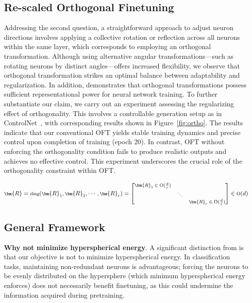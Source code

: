 \begin{itemize}[leftmargin=*,nosep]

\subsection{Re-scaled Orthogonal Finetuning}

Addressing the second question, a straightforward approach to adjust neuron directions involves applying a collective rotation or reflection across all neurons within the same layer, which corresponds to employing an orthogonal transformation. Although using alternative angular transformations—such as rotating neurons by distinct angles—offers increased flexibility, we observe that orthogonal transformation strikes an optimal balance between adaptability and regularization. In addition, \cite{liu2021orthogonal} demonstrates that orthogonal transformations possess sufficient representational power for neural network training. To further substantiate our claim, we carry out an experiment assessing the regularizing effect of orthogonality. This involves a controllable generation setup as in ControlNet~\cite{zhang2023adding}, with corresponding results shown in Figure~\ref{fig:ortho}. The results indicate that our conventional OFT yields stable training dynamics and precise control upon completion of training (epoch 20). In contrast, OFT without enforcing the orthogonality condition fails to produce realistic outputs and achieves no effective control. This experiment underscores the crucial role of the orthogonality constraint within OFT.

\begin{equation}
    \footnotesize
    \bm{R} = \text{diag}(\bm{R}_1, \bm{R}_2, \cdots, \bm{R}_r) = \begin{bmatrix}
    \bm{R}_1 \in \text{O}(\frac{d}{r}) & & \\
    & \ddots & \\
    & & \bm{R}_r \in \text{O}(\frac{d}{r})
    \end{bmatrix} \in \text{O}(d)
\end{equation}

\subsection{General Framework}

\textbf{Why not minimize hyperspherical energy}. A significant distinction from \cite{liu2021orthogonal} is that our objective is not to minimize hyperspherical energy. In classification tasks, maintaining non-redundant neurons is advantageous; forcing the neurons to be evenly distributed on the hypersphere (which minimum hyperspherical energy enforces) does not necessarily benefit finetuning, as this could undermine the information acquired during pretraining.


\end{itemize}
